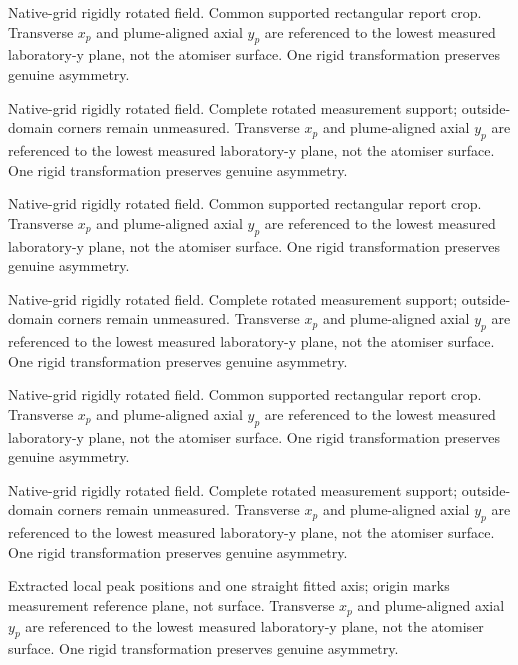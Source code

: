 \caption{Native-grid rigidly rotated field. Common supported rectangular report crop. Transverse $x_p$ and plume-aligned axial $y_p$ are referenced to the lowest measured laboratory-y plane, not the atomiser surface. One rigid transformation preserves genuine asymmetry.}

\caption{Native-grid rigidly rotated field. Complete rotated measurement support; outside-domain corners remain unmeasured. Transverse $x_p$ and plume-aligned axial $y_p$ are referenced to the lowest measured laboratory-y plane, not the atomiser surface. One rigid transformation preserves genuine asymmetry.}

\caption{Native-grid rigidly rotated field. Common supported rectangular report crop. Transverse $x_p$ and plume-aligned axial $y_p$ are referenced to the lowest measured laboratory-y plane, not the atomiser surface. One rigid transformation preserves genuine asymmetry.}

\caption{Native-grid rigidly rotated field. Complete rotated measurement support; outside-domain corners remain unmeasured. Transverse $x_p$ and plume-aligned axial $y_p$ are referenced to the lowest measured laboratory-y plane, not the atomiser surface. One rigid transformation preserves genuine asymmetry.}

\caption{Native-grid rigidly rotated field. Common supported rectangular report crop. Transverse $x_p$ and plume-aligned axial $y_p$ are referenced to the lowest measured laboratory-y plane, not the atomiser surface. One rigid transformation preserves genuine asymmetry.}

\caption{Native-grid rigidly rotated field. Complete rotated measurement support; outside-domain corners remain unmeasured. Transverse $x_p$ and plume-aligned axial $y_p$ are referenced to the lowest measured laboratory-y plane, not the atomiser surface. One rigid transformation preserves genuine asymmetry.}

\caption{Extracted local peak positions and one straight fitted axis; origin marks measurement reference plane, not surface. Transverse $x_p$ and plume-aligned axial $y_p$ are referenced to the lowest measured laboratory-y plane, not the atomiser surface. One rigid transformation preserves genuine asymmetry.}


